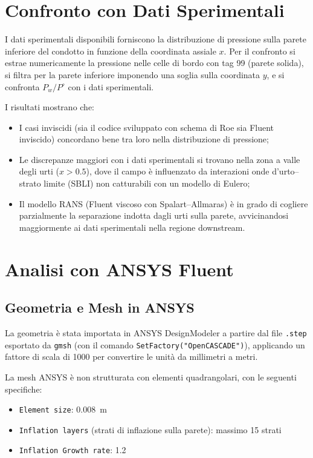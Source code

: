 \section{Confronto con Dati Sperimentali}
\label{sec:presa_exp}

I dati sperimentali disponibili forniscono la distribuzione di pressione sulla parete
inferiore del condotto in funzione della coordinata assiale $x$. Per il confronto si estrae
numericamente la pressione nelle celle di bordo con tag 99 (parete solida), si filtra
per la parete inferiore imponendo una soglia sulla coordinata $y$, e si confronta
$P_w/P^\circ$ con i dati sperimentali.

I risultati mostrano che:
\begin{itemize}
  \item I casi inviscidi (sia il codice sviluppato con schema di Roe sia Fluent inviscido)
    concordano bene tra loro nella distribuzione di pressione;
  \item Le discrepanze maggiori con i dati sperimentali si trovano nella zona a valle degli
    urti ($x > 0.5$), dove il campo è influenzato da interazioni onde d'urto--strato limite
    (SBLI) non catturabili con un modello di Eulero;
  \item Il modello RANS (Fluent viscoso con Spalart--Allmaras) è in grado di cogliere
    parzialmente la separazione indotta dagli urti sulla parete, avvicinandosi maggiormente
    ai dati sperimentali nella regione downstream.
\end{itemize}

\section{Analisi con ANSYS Fluent}
\label{sec:presa_fluent}

\subsection{Geometria e Mesh in ANSYS}

La geometria è stata importata in ANSYS DesignModeler a partire dal file \texttt{.step}
esportato da \texttt{gmsh} (con il comando \texttt{SetFactory("OpenCASCADE")}), applicando
un fattore di scala di 1000 per convertire le unità da millimetri a metri.

La mesh ANSYS è non strutturata con elementi quadrangolari, con le seguenti specifiche:
\begin{itemize}
  \item \texttt{Element size}: 0.008~m
  \item \texttt{Inflation layers} (strati di inflazione sulla parete): massimo 15 strati
  \item \texttt{Inflation Growth rate}: 1.2
\end{itemize}

